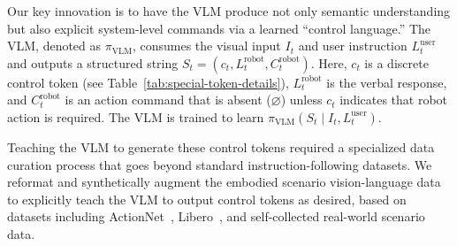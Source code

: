 Our key innovation is to have the VLM produce not only semantic understanding but also explicit system-level commands via a learned “control language.” The VLM, denoted as $\pi_{\text{VLM}}$, consumes the visual input $I_t$ and user instruction $L_t^{\text{user}}$ and outputs a structured string $S_t=(c_t, L_t^{\text{robot}}, C_t^{\text{robot}})$. Here, $c_t$ is a discrete control token (see Table~\ref{tab:special-token-details}), $L_t^{\text{robot}}$ is the verbal response, and $C_t^{\text{robot}}$ is an action command that is absent ($\varnothing$) unless $c_t$ indicates that robot action is required. The VLM is trained to learn $\pi_{\text{VLM}}(S_t \mid I_t, L_t^{\text{user}})$.

\begin{table}[thb!]
    \caption{Special tokens used to control the VITA-E framework's behavior.}
    \label{tab:special-token-details}
    \centering
\end{table}

Teaching the VLM to generate these control tokens required a specialized data curation process that goes beyond standard instruction-following datasets. We reformat and synthetically augment the embodied scenario vision-language data to explicitly teach the VLM to output control tokens as desired, based on datasets including ActionNet~\citep{fourier2025actionnet}, Libero~\citep{liu2023libero}, and self-collected real-world scenario data.

